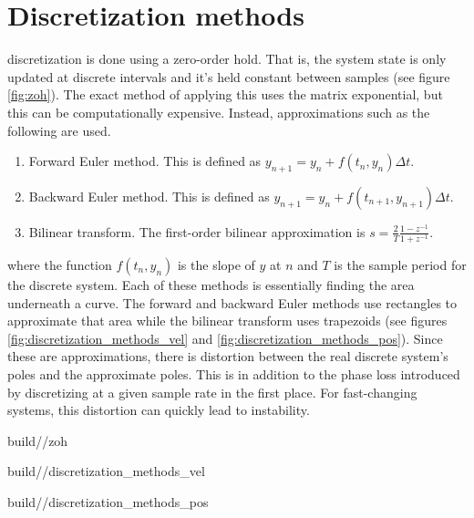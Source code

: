 \section{Discretization methods}

\Gls{discretization} is done using a zero-order hold. That is, the \gls{system}
\gls{state} is only updated at discrete intervals and it's held constant between
samples (see figure \ref{fig:zoh}). The exact method of applying this uses the
matrix exponential, but this can be computationally expensive. Instead,
approximations such as the following are used.
\begin{enumerate}
  \item Forward Euler method. This is defined as
    $y_{n+1} = y_n + f(t_n, y_n) \Delta t$.
  \item Backward Euler method. This is defined as
    $y_{n+1} = y_n + f(t_{n+1}, y_{n+1}) \Delta t$.
  \item Bilinear transform. The first-order bilinear approximation is
    $s = \frac{2}{T} \frac{1 - z^{-1}}{1 + z^{-1}}$.
\end{enumerate}

where the function $f(t_n, y_n)$ is the slope of $y$ at $n$ and $T$ is the
sample period for the discrete \gls{system}. Each of these methods is
essentially finding the area underneath a curve. The forward and backward Euler
methods use rectangles to approximate that area while the bilinear transform
uses trapezoids (see figures \ref{fig:discretization_methods_vel} and
\ref{fig:discretization_methods_pos}). Since these are approximations, there is
distortion between the real discrete \gls{system}'s poles and the approximate
poles. This is in addition to the phase loss introduced by discretizing at a
given sample rate in the first place. For fast-changing \glspl{system}, this
distortion can quickly lead to instability.
\begin{bookfigure}
  \begin{minisvg}{2}{build/\chapterpath/zoh}
      \caption{Zero-order hold of a system response}
      \label{fig:zoh}
  \end{minisvg}
  \hfill
  \begin{minisvg}{2}{build/\chapterpath/discretization_methods_vel}
    \caption{Discretization methods applied to velocity data}
    \label{fig:discretization_methods_vel}
  \end{minisvg}
  \hfill
  \begin{minisvg}{2}{build/\chapterpath/discretization_methods_pos}
    \caption{Position plot of discretization methods applied to velocity data}
    \label{fig:discretization_methods_pos}
  \end{minisvg}
\end{bookfigure}

